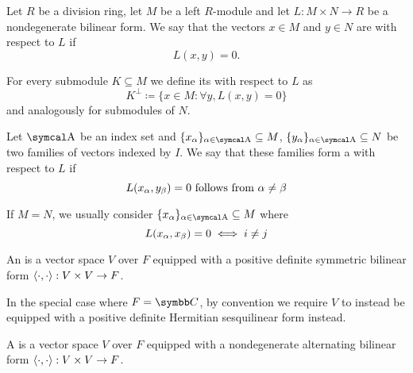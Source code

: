 \begin{definition}\label{def:orthogonality}
  Let \( R \) be a division ring, let \( M \) be a left \( R \)-module and let \( L: M \times N \to R \) be a nondegenerate bilinear form. We say that the vectors \( x \in M \) and \( y \in N \) are  with respect to \( L \) if
  \begin{equation*}
    L(x, y) = 0.
  \end{equation*}

  For every submodule \( K \subseteq M \) we define its  with respect to \( L \) as
  \begin{equation*}
    K^\perp \coloneqq \{ x \in M \colon \forall y, L(x, y) = 0 \}
  \end{equation*}
  and analogously for submodules of \( N \).

  Let \( \CA \) be an index set and \( \{ x_\al \}_{\al \in \CA} \subseteq M \), \( \{ y_\al \}_{\al \in \CA} \subseteq N \) be two families of vectors indexed by \( I \). We say that these families form a  with respect to \( L \) if
  \begin{equation*}
    L(x_\alpha, y_\beta) = 0 \text{ follows from } \alpha \neq \beta
  \end{equation*}

  If \( M = N \), we usually consider  \( \{ x_\al \}_{\al \in \CA} \subseteq M \) where
  \begin{equation*}
    L(x_\alpha, x_\beta) = 0 \iff i \neq j
  \end{equation*}
\end{definition}

\begin{definition}\label{def:inner_product_space}
  An  is a vector space \( V \) over \( F \) equipped with a positive definite symmetric bilinear form \( \left\langle \cdot, \cdot \right\rangle: V \times V \to F \).

  In the special case where \( F = \BC \), by convention we require \( V \) to instead be equipped with a positive definite Hermitian sesquilinear form instead.
\end{definition}

\begin{definition}\label{def:symplectic_vector_space}
  A  is a vector space \( V \) over \( F \) equipped with a nondegenerate  alternating bilinear form \( \left\langle \cdot, \cdot \right\rangle: V \times V \to F \).
\end{definition}


